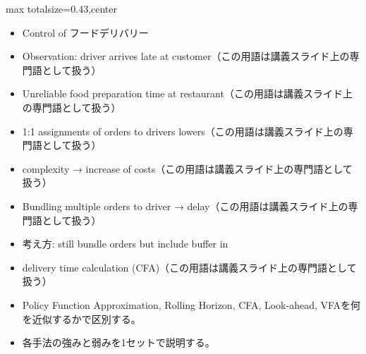 \clearpage
{}
\begin{minipage}[t]{0.405\textwidth}
\begin{adjustbox}{max totalsize={\textwidth}{0.43\textheight},center}
\begin{minipage}{\textwidth}\scriptsize
{}\begin{itemize}
\item Control of フードデリバリー
\item Observation: driver arrives late at customer（この用語は講義スライド上の専門語として扱う）
\item Unreliable food preparation time at restaurant（この用語は講義スライド上の専門語として扱う）
\item 1:1 assignments of orders to drivers lowers（この用語は講義スライド上の専門語として扱う）
\item complexity → increase of costs（この用語は講義スライド上の専門語として扱う）
\item Bundling multiple orders to driver → delay（この用語は講義スライド上の専門語として扱う）
\item 考え方: still bundle orders but include buffer in
\item delivery time calculation (CFA)（この用語は講義スライド上の専門語として扱う）
\end{itemize}\begin{itemize}
\item Policy Function Approximation, Rolling Horizon, CFA, Look-ahead, VFAを何を近似するかで区別する。
\item 各手法の強みと弱みを1セットで説明する。
\end{itemize}
\end{minipage}
\end{adjustbox}
\end{minipage}\hfill
